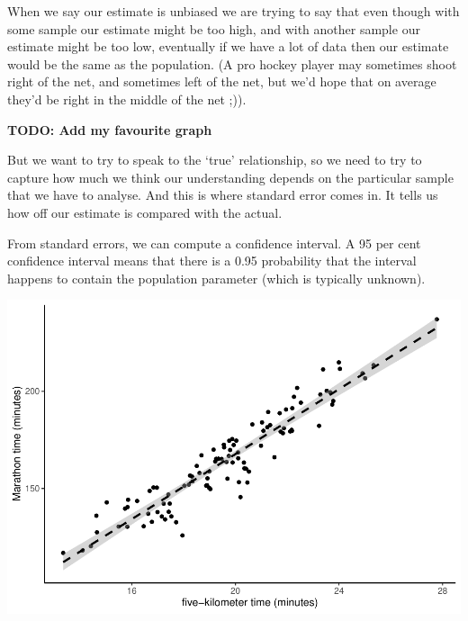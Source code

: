 \documentclass[
]{book}
\newenvironment{Shaded}{\begin{snugshade}}{\end{snugshade}}
\newcommand{\DataTypeTok}[1]{\textcolor[rgb]{0.13,0.29,0.53}{#1}}
\newcommand{\KeywordTok}[1]{\textcolor[rgb]{0.13,0.29,0.53}{\textbf{#1}}}
\newcommand{\NormalTok}[1]{#1}
\newcommand{\OperatorTok}[1]{\textcolor[rgb]{0.81,0.36,0.00}{\textbf{#1}}}
\newcommand{\OtherTok}[1]{\textcolor[rgb]{0.56,0.35,0.01}{#1}}
\newcommand{\StringTok}[1]{\textcolor[rgb]{0.31,0.60,0.02}{#1}}
\begin{document}
When we say our estimate is unbiased we are trying to say that even though with some sample our estimate might be too high, and with another sample our estimate might be too low, eventually if we have a lot of data then our estimate would be the same as the population. (A pro hockey player may sometimes shoot right of the net, and sometimes left of the net, but we'd hope that on average they'd be right in the middle of the net ;)).

\textbf{TODO: Add my favourite graph}

But we want to try to speak to the `true' relationship, so we need to try to capture how much we think our understanding depends on the particular sample that we have to analyse. And this is where standard error comes in. It tells us how off our estimate is compared with the actual.

From standard errors, we can compute a confidence interval. A 95 per cent confidence interval means that there is a 0.95 probability that the interval happens to contain the population parameter (which is typically unknown).

\begin{Shaded}
\end{Shaded}

\includegraphics{telling_stories_with_data_files/figure-latex/unnamed-chunk-358-1.pdf}
\end{document}
